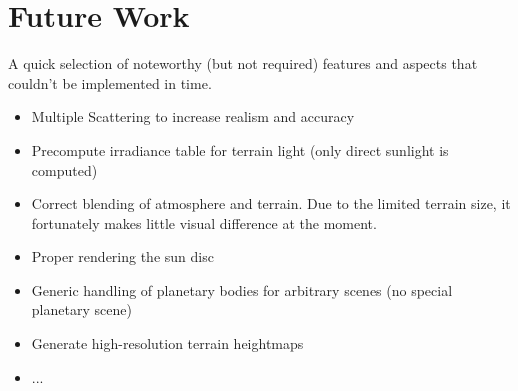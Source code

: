 \documentclass[12pt]{article}
\begin{document}
\section*{Future Work}
A quick selection of noteworthy (but not required) features and aspects that couldn't be implemented in time.
\begin{itemize}
\item Multiple Scattering to increase realism and accuracy
\item Precompute irradiance table for terrain light (only direct sunlight is computed)
\item Correct blending of atmosphere and terrain. Due to the limited terrain size, it fortunately makes little visual difference at the moment.
\item Proper rendering the sun disc
\item Generic handling of planetary bodies for arbitrary scenes (no special planetary scene)
\item Generate high-resolution terrain heightmaps
\item ...
\end{itemize}
\end{document}
